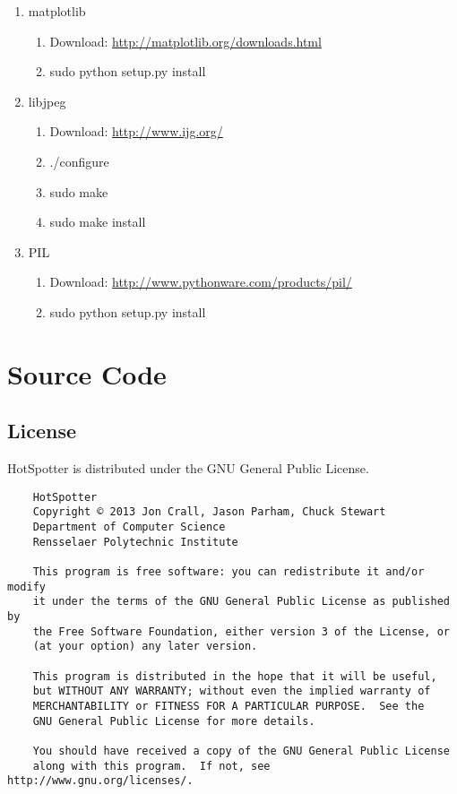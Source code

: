 \documentclass[a4paper,10pt]{article}
\begin{document}
\begin{enumerate}
            \item matplotlib 
                \begin{enumerate}
                    \item Download: \url{http://matplotlib.org/downloads.html}
                    \item sudo python setup.py install
                \end{enumerate}

            \item libjpeg 
                \begin{enumerate}
                    \item Download: \url{http://www.ijg.org/}
                    \item ./configure
                    \item sudo make
                    \item sudo make install
                \end{enumerate}

            \item PIL 
                \begin{enumerate}
                    \item Download:
                        \url{http://www.pythonware.com/products/pil/}
                    \item sudo python setup.py install
                \end{enumerate}
        \end{enumerate}
        \;


\section{Source Code}

    \subsection{License}
HotSpotter is distributed under the GNU General Public License.
\begin{Verbatim} 
    HotSpotter
    Copyright © 2013 Jon Crall, Jason Parham, Chuck Stewart
    Department of Computer Science 
    Rensselaer Polytechnic Institute

    This program is free software: you can redistribute it and/or modify
    it under the terms of the GNU General Public License as published by
    the Free Software Foundation, either version 3 of the License, or
    (at your option) any later version.

    This program is distributed in the hope that it will be useful,
    but WITHOUT ANY WARRANTY; without even the implied warranty of
    MERCHANTABILITY or FITNESS FOR A PARTICULAR PURPOSE.  See the
    GNU General Public License for more details.

    You should have received a copy of the GNU General Public License
    along with this program.  If not, see http://www.gnu.org/licenses/.


\end{Verbatim}
\end{document}
